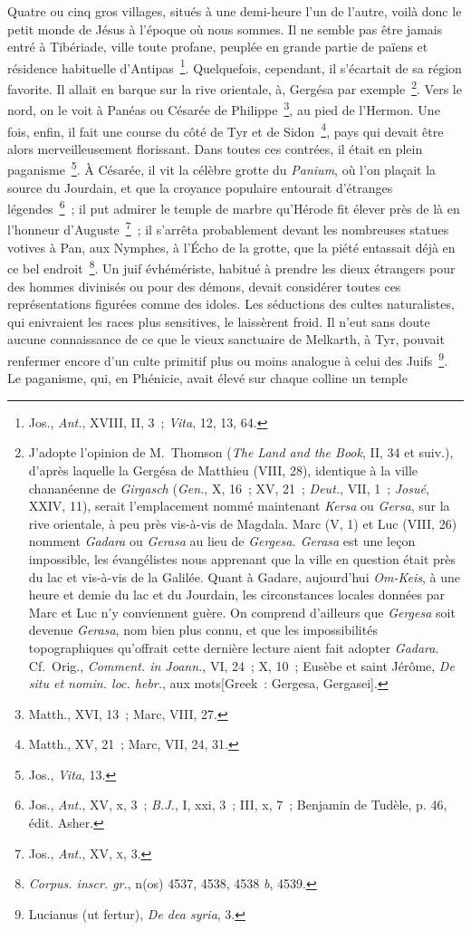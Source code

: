 \documentclass[french,twoside]{book} %
\begin{document}
Quatre ou cinq gros villages, situés à une demi-heure l’un de l’autre, voilà donc le petit monde de Jésus à l’époque où nous sommes. Il ne semble pas être jamais entré à Tibériade, ville toute profane, peuplée en grande partie de païens et résidence habituelle d’Antipas \footnote{ Jos., {\itshape Ant.}, XVIII, II, 3 ; {\itshape Vita}, 12, 13, 64.}. Quelquefois, cependant, il s’écartait de sa région favorite. Il allait en barque sur la rive orientale, à, Gergésa par exemple \footnote{ J’adopte l’opinion de M. Thomson ({\itshape The Land and the Book}, II, 34 et suiv.), d’après laquelle la Gergésa de Matthieu (VIII, 28), identique à la ville chananéenne de {\itshape Girgasch} ({\itshape Gen.}, X, 16 ; XV, 21 ; {\itshape Deut.}, VII, 1 ; {\itshape Josué}, XXIV, 11), serait l’emplacement nommé maintenant {\itshape Kersa} ou {\itshape Gersa}, sur la rive orientale, à peu près vis-à-vis de Magdala. Marc (V, 1) et Luc (VIII, 26) nomment {\itshape Gadara} ou {\itshape Gerasa} au lieu de {\itshape Gergesa. Gerasa} est une leçon impossible, les évangélistes nous apprenant que la ville en question était près du lac et vis-à-vis de la Galilée. Quant à Gadare, aujourd’hui {\itshape Om-Keis}, à une heure et demie du lac et du Jourdain, les circonstances locales données par Marc et Luc n’y conviennent guère. On comprend d’ailleurs que {\itshape Gergesa} soit devenue {\itshape Gerasa}, nom bien plus connu, et que les impossibilités topographiques qu’offrait cette dernière lecture aient fait adopter {\itshape Gadara}. Cf. Orig., {\itshape Comment. in Joann.}, VI, 24 ; X, 10 ; Eusèbe et saint Jérôme, {\itshape De situ et nomin. loc. hebr.}, aux mots[Greek : Gergesa, Gergasei].}. Vers le nord, on le voit à Panéas ou Césarée de Philippe \footnote{Matth., XVI, 13 ; Marc, VIII, 27.}, au pied de l’Hermon. Une fois, enfin, il fait une course du côté de Tyr et de Sidon \footnote{Matth., XV, 21 ; Marc, VII, 24, 31.}, pays qui devait être alors merveilleusement florissant. Dans toutes ces contrées, il était en plein paganisme \footnote{ Jos., {\itshape Vita}, 13.}. À Césarée, il vit la célèbre grotte du {\itshape Panium}, où l’on plaçait la source du Jourdain, et que la croyance populaire entourait d’étranges légendes \footnote{ Jos., {\itshape Ant.}, XV, x, 3 ; {\itshape B.J.}, I, xxi, 3 ; III, x, 7 ; Benjamin de Tudèle, p. 46, édit. Asher.} ; il put admirer le temple de marbre qu’Hérode fit élever près de là en l’honneur d’Auguste \footnote{ Jos., {\itshape Ant.}, XV, \textsc{x}, 3.} ; il s’arrêta probablement devant les nombreuses statues votives à Pan, aux Nymphes, à l’Écho de la grotte, que la piété entassait déjà en ce bel endroit \footnote{{\itshape Corpus. inscr. gr.}, n(os) 4537, 4538, 4538 {\itshape b}, 4539.}. Un juif évhémériste, habitué à prendre les dieux étrangers pour des hommes divinisés ou pour des démons, devait considérer toutes ces représentations figurées comme des idoles. Les séductions des cultes naturalistes, qui enivraient les races plus sensitives, le laissèrent froid. Il n’eut sans doute aucune connaissance de ce que le vieux sanctuaire de Melkarth, à Tyr, pouvait renfermer encore d’un culte primitif plus ou moins analogue à celui des Juifs \footnote{ Lucianus (ut fertur), {\itshape De dea syria}, 3.}. Le paganisme, qui, en Phénicie, avait élevé sur chaque colline un temple 
\end{document}
